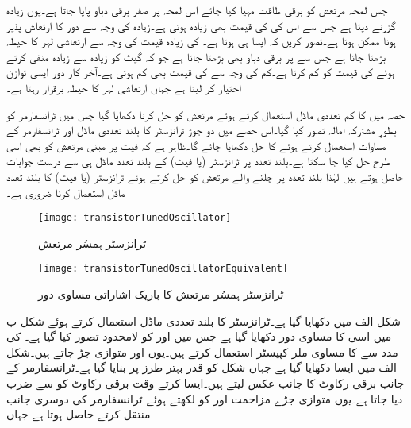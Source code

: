 جس لمحہ مرتعش کو برقی طاقت  مہیا کیا جائے اس لمحہ  پر صفر برقی دباو پایا جاتا ہے۔یوں   زیادہ  گزرنے دیتا ہے جس سے اس کی  کی قیمت بھی زیادہ ہوتی ہے۔زیادہ  کی وجہ سے دور کا ارتعاش پذیر ہونا ممکن ہوتا ہے۔تصور  کریں کہ ایسا ہی ہوتا ہے۔ کی زیادہ قیمت کی وجہ سے ارتعاشی لہر کا حیطہ بڑھتا جاتا ہے جس سے  پر برقی دباو  بھی بڑھتا جاتا ہے جو کہ گیٹ کو زیادہ سے زیادہ منفی کرتے ہوئے  کی قیمت کو کم کرتا ہے۔کم  کی وجہ سے  کی قیمت بھی کم ہوتی ہے۔آخر کار دور ایسی توازن اختیار  کر لیتا ہے جہاں ارتعاشی لہر کا حیطہ برقرار رہتا ہے۔ 

حصہ  میں  کا کم تعددی ماڈل استعمال کرتے  ہوئے مرتعش کو حل کرنا دکھایا گیا جس میں ٹرانسفارمر کو بطورِ مشترکہ امالہ تصور کیا گیا۔اس حصے میں دو جوڑ ٹرانزسٹر کا بلند تعددی ماڈل اور ٹرانسفارمر کے مساوات استعمال کرتے ہوئے  کا حل دکھایا جائے گا۔ظاہر ہے  کہ فیٹ پر مبنی مرتعش کو بھی اسی طرح حل کیا جا سکتا ہے۔بلند تعدد پر ٹرانزسٹر (یا فیٹ) کے بلند تعدد ماڈل ہی سے درست جوابات حاصل ہوتے ہیں لہٰذا بلند تعدد پر چلنے والے مرتعش کو حل کرتے ہوئے ٹرانزسٹر (یا فیٹ) کا بلند تعدد ماڈل استعمال کرنا ضروری ہے۔
\begin{figure}
\centering
\texttt{[image: transistorTunedOscillator]}
\caption{ٹرانزسٹر ہمسُر مرتعش}
\label{شکل_ٹرانزسٹر_ہمسر_مرتعش}
\end{figure}
%
\begin{figure}
\centering
\texttt{[image: transistorTunedOscillatorEquivalent]}
\caption{ٹرانزسٹر ہمسُر مرتعش کا باریک اشاراتی مساوی دور}
\label{شکل_ٹرانزسٹر_ہمسر_مرتعش_مساوی}
\end{figure}
%
شکل  الف میں  دکھایا گیا ہے۔ٹرانزسٹر کا بلند تعددی ماڈل استعمال کرتے ہوئے شکل  ب میں اسی کا مساوی دور دکھایا گیا ہے جس میں  اور  کو لامحدود تصور کیا گیا ہے۔ کی مدد سے  کا مساوی ملر کپیسٹر استعمال کرتے ہیں۔یوں  اور  متوازی جڑ جاتے ہیں۔شکل  الف میں ایسا دکھایا گیا ہے جہاں شکل کو قدر بہتر طرز پر بنایا گیا ہے۔ٹرانسفارمر کے  جانب برقی رکاوٹ کا  جانب عکس لیتے ہیں۔ایسا کرتے وقت برقی رکاوٹ کو  سے ضرب دیا جاتا ہے۔یوں متوازی جڑے مزاحمت  اور  کو  لکھتے ہوئے ٹرانسفارمر کی دوسری جانب منتقل کرتے  حاصل ہوتا ہے جہاں
